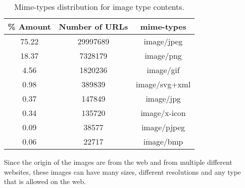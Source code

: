 \begin{table}[H]
\centering
\caption{Mime-types distribution for image type contents.}
\label{tbl:image-types}
\begin{tabular}{|c|c|c|}
\hline
\textbf{\% Amount} & \textbf{Number of URLs} & \textbf{mime-types} \\ \hline
75.22              & 29997689                & image/jpeg          \\ \hline
18.37              & 7328179                 & image/png           \\ \hline
4.56               & 1820236                 & image/gif           \\ \hline
0.98               & 389839                  & image/svg+xml       \\ \hline
0.37               & 147849                  & image/jpg           \\ \hline
0.34               & 135720                  & image/x-icon        \\ \hline
0.09               & 38577                   & image/pjpeg         \\ \hline
0.06               & 22717                   & image/bmp           \\ \hline
\end{tabular}
\end{table}

Since the origin of the images are from the web and from multiple different websites, these images can have many sizes, different resolutions and any type that is allowed on the web.

